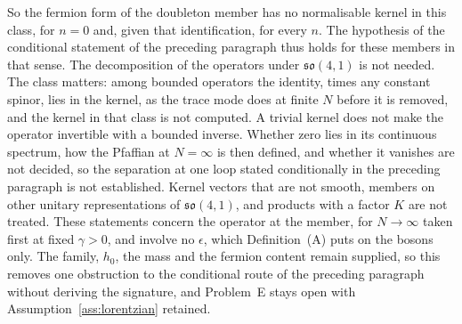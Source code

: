 So the fermion form of the doubleton member has no normalisable kernel in this class, for \(n=0\) and, given that identification, for every \(n\). The hypothesis of the conditional statement of the preceding paragraph thus holds for these members in that sense. The decomposition of the operators under \(\mathfrak{so}(4,1)\) is not needed. The class matters: among bounded operators the identity, times any constant spinor, lies in the kernel, as the trace mode does at finite \(N\) before it is removed, and the kernel in that class is not computed. A trivial kernel does not make the operator invertible with a bounded inverse. Whether zero lies in its continuous spectrum, how the Pfaffian at \(N=\infty\) is then defined, and whether it vanishes are not decided, so the separation at one loop stated conditionally in the preceding paragraph is not established. Kernel vectors that are not smooth, members on other unitary representations of \(\mathfrak{so}(4,1)\), and products with a factor \(K\) are not treated. These statements concern the operator at the member, for \(N\to\infty\) taken first at fixed \(\gamma>0\), and involve no \(\epsilon\), which Definition~(A) puts on the bosons only. The family, \(h_0\), the mass and the fermion content remain supplied, so this removes one obstruction to the conditional route of the preceding paragraph without deriving the signature, and Problem~E stays open with Assumption~\ref{ass:lorentzian} retained.

